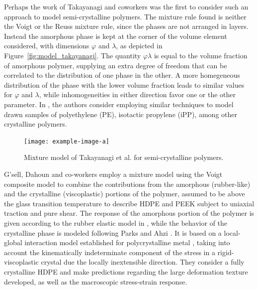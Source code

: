 Perhaps the work of Takayanagi and coworkers \citep{ takayanagiApplicationEquivalentModel1964} was the first to consider such an approach to model semi-crystalline polymers.
The mixture rule found is neither the Voigt or the Reuss mixture rule, since the phases are not arranged in layers.
Instead the amorphous phase is kept at the corner of the volume element considered, with dimensions $\varphi$ and $\lambda$, as depicted in Figure~\eqref{fig:model_takayanagi}.
The quantity $\varphi \lambda$ is equal to the volume fraction of amorphous polymer, supplying an extra degree of freedom that can be correlated to the distribution of one phase in the other.
A more homegeneous distribution of the phase with the lower volume fraction leads to similar values for $\varphi$ and $\lambda$, while inhomogeneities in either direction favor one or the other parameter.
In \citep{takayanagiMechanicalPropertiesFine1967}, the authors consider employing similar techniques to model drawn samples of polyethylene (PE), isotactic propylene (iPP), among other crystalline polymers.
\begin{figure}
	\centering
	\texttt{[image: example-image-a]}
	\caption{Mixture model of Takayanagi et al. \citep{takayanagiApplicationEquivalentModel1964} for semi-crystalline polymers.}
\label{fig:model_takayanagi}
\end{figure}

G'sell, Dahoun and co-workers \citep{gsellEvolutionMicrostructureSemicrystalline1994, dahounPlasticBehaviorDeformation1995} employ a mixture model using the Voigt composite model to combine the contributions from the amorphous (rubber-like) and the crystalline (viscoplastic) portions of the polymer, assumed to be above the glass transition temperature to describe HDPE and PEEK subject to uniaxial traction and pure shear.
The response of the amorphous portion of the polymer is given according to the rubber elastic model in \citep{wuImprovedNetworkModels1993}, while the behavior of the crystalline phase is modeled following Parks and Ahzi \citep{parksPolycrystallinePlasticDeformation1990}.
It is based on a local-global interaction model established for polycrystalline metal \citep{molinariSelfConsistentApproach1987}, taking into account the kinematically indeterminate component of the stress in a rigid-viscoplastic crystal due the locally inextensible direction.
They consider a fully crystalline HDPE and make predictions regarding the large deformation texture developed, as well as the macroscopic stress-strain response.

